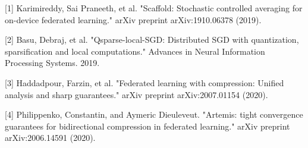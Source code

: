 \documentclass{article}
\begin{document}
[1] Karimireddy, Sai Praneeth, et al. "Scaffold: Stochastic controlled averaging for on-device federated learning." arXiv preprint arXiv:1910.06378 (2019).\vspace{-1.8pt} 

[2] Basu, Debraj, et al. "Qsparse-local-SGD: Distributed SGD with quantization, sparsification and local computations." Advances in Neural Information Processing Systems. 2019.\vspace{-1.8pt} 

[3] Haddadpour, Farzin, et al. "Federated learning with compression: Unified analysis and sharp guarantees." arXiv preprint arXiv:2007.01154 (2020).\vspace{-1.8pt} 

[4] Philippenko, Constantin, and Aymeric Dieuleveut. "Artemis: tight convergence guarantees for bidirectional compression in federated learning." arXiv preprint arXiv:2006.14591 (2020).
\end{document}
